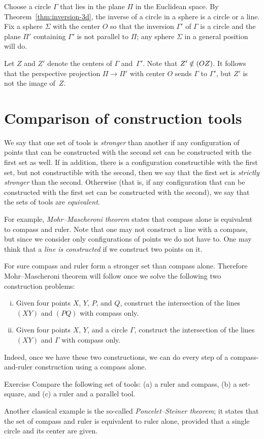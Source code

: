 Choose a circle $\Gamma$ that lies in the plane $\Pi$ in the Euclidean space.
By Theorem~\ref{thm:inversion-3d}, 
the inverse of a circle in a sphere is a circle or a line.
Fix a sphere $\Sigma$ with the center $O$ so that the inversion $\Gamma'$ of $\Gamma$
is a circle and the plane $\Pi'$ containing $\Gamma'$ is not parallel to $\Pi$;
any sphere $\Sigma$ in a general position will do.

Let $Z$ and $Z'$ denote the centers of $\Gamma$ and~$\Gamma'$.
Note that  $Z'\z\notin(OZ)$.
It follows that the perspective projection $\Pi\to \Pi'$ with center $O$ sends $\Gamma$ to $\Gamma'$, but $Z'$ is not the image of~$Z$.
\qeds

\section{Comparison of construction tools}

We say that one set of tools is \emph{stronger} than another if any configuration of points that can be constructed with the second set can be constructed with the first set as well.
If in addition, there is a configuration constructible with the first set, but not constructible with the second, then we say that the first set is {}\emph{strictly stronger} than the second.
Otherwise (that is, if any configuration that can be constructed with the first set can be constructed with the second), we say that the sets of tools are \emph{equivalent}. 

For example, \emph{Mohr--Mascheroni theorem} states that compass alone is equivalent to compass and ruler.
Note that one may not construct a line with a compass, but since we consider only configurations of points we do not have to.
One may think that a \emph{line is constructed} if we construct two points on it.

For sure compass and ruler form a stronger set than compass alone.
Therefore Mohr--Mascheroni theorem will follow once we solve the following two construction problems:
\begin{enumerate}[(i)]
\item Given four points $X$, $Y$, $P$, and $Q$, construct the intersection of the lines $(XY)$ and $(PQ)$ with compass only.
\item  Given four points $X$, $Y$, and a circle $\Gamma$, construct the intersection of the lines $(XY)$ and $\Gamma$ with compass only.
\end{enumerate}
Indeed, once we have these two constructions, we can do every step of a compass-and-ruler construction using a compass alone.

\begin{thm}{Exercise}\label{ex:comparison}
Compare the following set of tools: (a) a ruler and compass, (b) a set-square, and (c) a ruler and a parallel tool.
\end{thm}

Another classical example is the so-called \emph{Poncelet--Steiner theorem};
it states that the set of compass and ruler is equivalent to ruler alone, provided that a single circle and its center are given.
